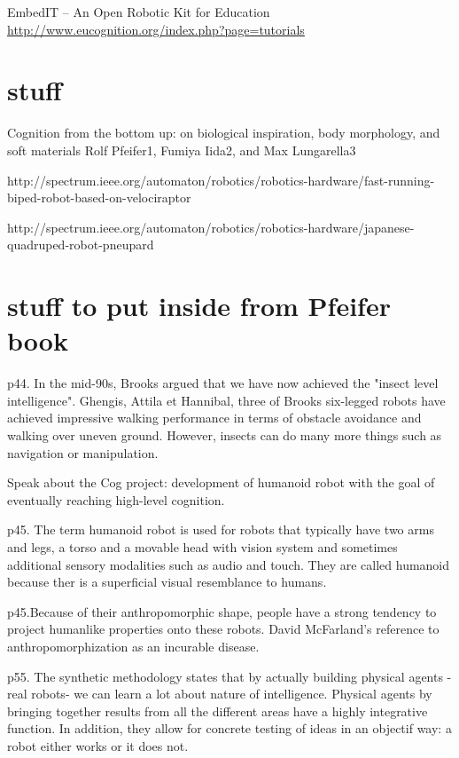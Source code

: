 EmbedIT – An Open Robotic Kit for Education
\url{http://www.eucognition.org/index.php?page=tutorials}




\section*{stuff}
Cognition from the bottom up: on biological inspiration, body morphology, and soft materials Rolf Pfeifer1, Fumiya Iida2, and Max Lungarella3

http://spectrum.ieee.org/automaton/robotics/robotics-hardware/fast-running-biped-robot-based-on-velociraptor

http://spectrum.ieee.org/automaton/robotics/robotics-hardware/japanese-quadruped-robot-pneupard

\section*{stuff to put inside from Pfeifer book}

p44. In the mid-90s, Brooks argued that we have now achieved the "insect level intelligence". Ghengis, Attila et Hannibal, three of Brooks six-legged robots have achieved impressive walking performance in terms of obstacle avoidance and walking over uneven ground. However, insects can do many more things such as navigation or manipulation.

Speak about the Cog project: development of humanoid robot with the goal of eventually reaching high-level cognition.

p45. The term humanoid robot is used for robots that typically have two arms and legs, a torso and a movable head with vision system and sometimes additional sensory modalities such as audio and touch. They are called humanoid because ther is a superficial visual resemblance to humans.

p45.Because of their anthropomorphic shape, people have a strong tendency to project humanlike properties onto these robots. David McFarland's reference to anthropomorphization as an incurable disease.


p55. The synthetic methodology states that by actually building physical agents -real robots- we can learn a lot about nature of intelligence. Physical agents by bringing together results from all the different areas have a highly integrative function. In addition, they allow for concrete testing of ideas in an objectif way: a robot either works or it does not.


